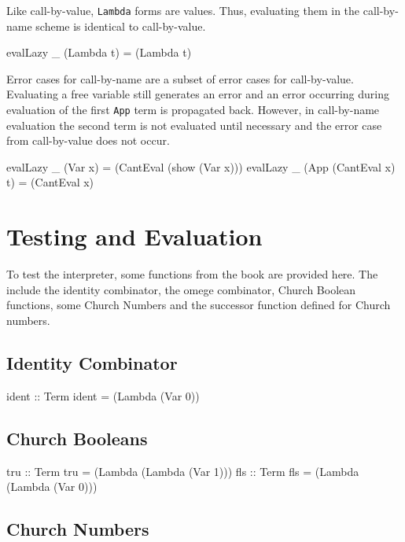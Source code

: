 \documentclass[10pt]{article}
\begin{document}
Like call-by-value, \texttt{Lambda} forms are values.  Thus,
evaluating them in the call-by-name scheme is identical to
call-by-value. 

\begin{code}
  evalLazy _ (Lambda t) = (Lambda t)
\end{code}

Error cases for call-by-name are a subset of error cases for
call-by-value.  Evaluating a free variable still generates an error
and an error occurring during evaluation of the first \texttt{App} term
is propagated back.  However, in call-by-name evaluation the second
term is not evaluated until necessary and the error case from
call-by-value does not occur.

\begin{code}
  evalLazy _ (Var x) = (CantEval (show (Var x)))
  evalLazy _ (App (CantEval x) t) = (CantEval x)
\end{code}

\section{Testing and Evaluation}

To test the interpreter, some functions from the book are provided
here.  The include the identity combinator, the omege combinator,
Church Boolean functions, some Church Numbers and the successor
function defined for Church numbers.

\subsection{Identity Combinator}

\begin{code}
  ident :: Term
  ident = (Lambda (Var 0))
\end{code}

\subsection{Church Booleans}

\begin{code}
  tru :: Term
  tru = (Lambda (Lambda (Var 1)))
  fls :: Term
  fls = (Lambda (Lambda (Var 0)))
\end{code}

\subsection{Church Numbers}
\end{document}
